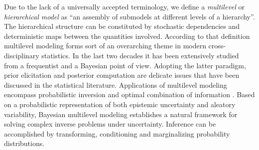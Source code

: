 Due to the lack of a universally accepted terminology, we define a \textit{multilevel} or \textit{hierarchical model} as ``an assembly of submodels at different levels of a hierarchy''.
The hierarchical structure can be constituted by stochastic dependencies and deterministic maps between the quantities involved.
According to that definition multilevel modeling forms sort of an overarching theme in modern cross-disciplinary statistics.
In the last two decades it has been extensively studied from a frequentist \cite{Multilevel:Davidian2003,Multilevel:Banks2012} and a Bayesian \cite{Multilevel:Wakefield1996,Multilevel:Lunn2005} point of view.
Adopting the latter paradigm, prior elicitation \cite{Multilevel:Daniels1999,Multilevel:Gelman2006:b}
and posterior computation \cite{MCMC:Wakefield1994,MCMC:Bennett1995} are delicate issues that have been discussed in the statistical literature.
Applications of multilevel modeling encompass probabilistic inversion \cite{Nagel:IPW2013:Proc,Multilevel:Ballesteros2014:Proc} and optimal combination of information \cite{Multilevel:Draper1992,Nagel:ICVRAM2014:Proc}.
Based on a probabilistic representation of both epistemic uncertainty and aleatory variability,
Bayesian multilevel modeling establishes a natural framework for solving complex inverse problems under uncertainty.
Inference can be accomplished by transforming, conditioning and marginalizing probability distributions.

